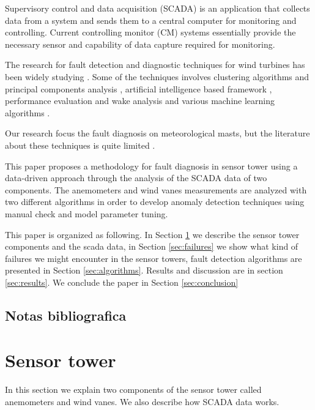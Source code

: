 \documentclass[journal]{IEEEtran}
\begin{document}
Supervisory control and data acquisition (SCADA) is an application that collects data from a system and sends them to a central computer for monitoring and controlling. Current controlling monitor (CM) systems essentially provide the necessary sensor and capability of data capture required for monitoring.

The research for  fault detection and diagnostic techniques for wind turbines has been widely studying  \cite{tchakoua2014wind,wymore2015survey}. Some of the techniques involves
clustering algorithms and principal components analysis \cite{kim2011use}, artificial intelligence based framework \cite{wang2014scada}, performance evaluation and wake analysis \cite{astolfi2016mathematical} and various machine learning algorithms  \cite{kusiak2011prediction}.

Our research focus the fault diagnosis on meteorological masts,   
but the literature about these techniques is quite limited \cite{hasu2006weather} .

This paper proposes a methodology for fault diagnosis in sensor tower using a data-driven approach through the analysis of the SCADA data of two components. The anemometers and wind vanes measurements are analyzed with two different algorithms in order to develop anomaly detection techniques using manual check and model parameter tuning. 

This paper is organized as following. In Section \ref{sec:sensortower} we describe the sensor tower components and the scada data, in Section \ref{sec:failures} we show what kind of failures we might encounter in the sensor towers, fault detection algorithms are presented in Section \ref{sec:algorithms}. Results and discussion are in section \ref{sec:results}. We conclude the paper in Section \ref{sec:conclusion}


\subsection{Notas bibliografica}

\cite{lu2009review}

\cite{schlechtingen2012condition}

\cite{schlechtingen2011comparative}

\cite{yang2014wind}




\section{Sensor tower}\label{sec:sensortower}
In this section we explain two components of the sensor tower called anemometers and wind vanes.  We also describe how SCADA data works.
\end{document}
